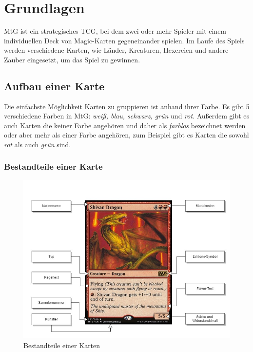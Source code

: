 \chapter{Grundlagen}\label{ch:grundlagen}

\ac{MtG} ist ein strategisches \ac{TCG}, bei dem zwei oder mehr Spieler mit einem individuellen Deck von Magic-Karten gegeneinander spielen. Im Laufe des Spiels werden verschiedene Karten, wie Länder, Kreaturen, Hexereien und andere Zauber eingesetzt, um das Spiel zu gewinnen. \cite{rulebook:2013}

\section{Aufbau einer Karte}\label{ch:grundlagen:aufbau}
Die einfachste Möglichkeit Karten zu gruppieren ist anhand ihrer Farbe. Es gibt 5 verschiedene Farben in \ac{MtG}: \emph{weiß, blau, schwarz, grün} und \emph{rot}. Außerdem gibt es auch Karten die keiner Farbe angehören und daher als \emph{farblos} bezeichnet werden oder aber mehr als einer Farbe angehören, zum Beispiel gibt es Karten die sowohl \emph{rot} als auch \emph{grün} sind. \cite{rulebook:2013}

\subsection{Bestandteile einer Karte}

\begin{figure}[t]
	\myfloatalign
	\includegraphics[width=\textwidth]{gfx/card.jpg}
	\caption{Bestandteile einer Karten}
	\label{fig:cardparts}
\end{figure}

